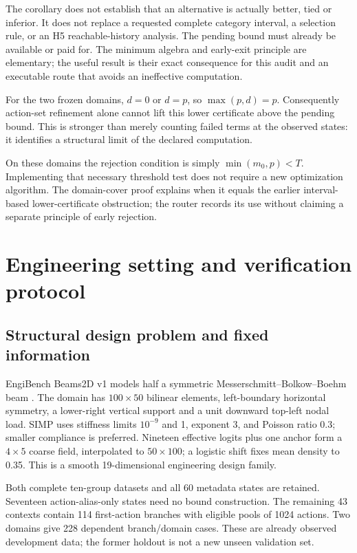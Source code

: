 \documentclass[]{interact}
\begin{document}
The corollary does not establish that an alternative is actually better, tied or inferior. It does not replace a requested complete category interval, a selection rule, or an H5 reachable-history analysis. The pending bound must already be available or paid for. The minimum algebra and early-exit principle are elementary; the useful result is their exact consequence for this audit and an executable route that avoids an ineffective computation.

For the two frozen domains, $d=0$ or $d=p$, so $\max(p,d)=p$. Consequently action-set refinement alone cannot lift this lower certificate above the pending bound. This is stronger than merely counting failed terms at the observed states: it identifies a structural limit of the declared computation.

On these domains the rejection condition is simply $\min(m_0,p)<T$. Implementing that necessary threshold test does not require a new optimization algorithm. The domain-cover proof explains when it equals the earlier interval-based lower-certificate obstruction; the router records its use without claiming a separate principle of early rejection.

\section{Engineering setting and verification protocol}

\subsection{Structural design problem and fixed information}

EngiBench Beams2D v1 models half a symmetric Messerschmitt--Bolkow--Boehm beam \citep{ref23}. The domain has $100\times50$ bilinear elements, left-boundary horizontal symmetry, a lower-right vertical support and a unit downward top-left nodal load. SIMP uses stiffness limits $10^{-9}$ and 1, exponent 3, and Poisson ratio 0.3; smaller compliance is preferred. Nineteen effective logits plus one anchor form a $4\times5$ coarse field, interpolated to $50\times100$; a logistic shift fixes mean density to 0.35. This is a smooth 19-dimensional engineering design family.

Both complete ten-group datasets and all 60 metadata states are retained. Seventeen action-alias-only states need no bound construction. The remaining 43 contexts contain 114 first-action branches with eligible pools of 1024 actions. Two domains give 228 dependent branch/domain cases. These are already observed development data; the former holdout is not a new unseen validation set.
\end{document}
